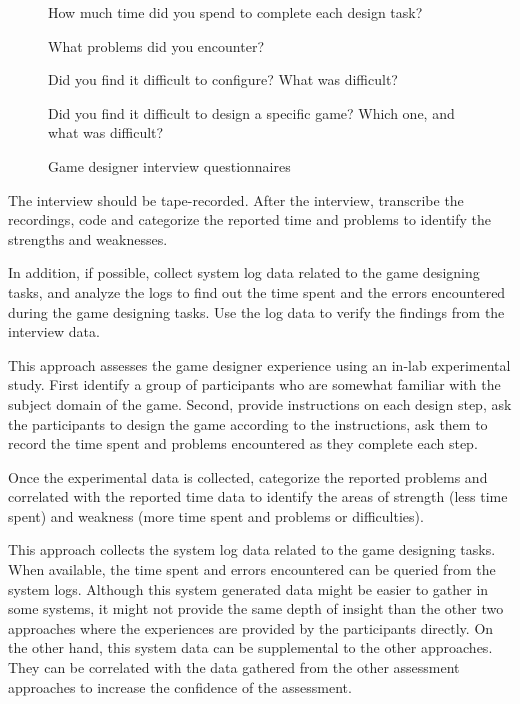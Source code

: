 \begin{figure}[ht!]
\begin{mybox}
\begin{compactenum}
\item How much time did you spend to complete each design task?
\item What problems did you encounter?
\item Did you find it difficult to configure? What was difficult?
\item Did you find it difficult to design a specific game? Which one, and what was difficult?
\end{compactenum}
\end{mybox}
\caption{Game designer interview questionnaires}
\label{fig:game-designer-interview}  
\end{figure}

The interview should be tape-recorded. After the interview, transcribe the recordings, code and categorize the reported 
time and problems to identify the strengths and weaknesses.

In addition, if possible, collect system log data related to the game designing tasks, and analyze the logs to find out the time 
spent and the errors encountered during the game designing tasks. Use the log data to verify the findings from the interview data.

\label{In-lab game design study}

This approach assesses the game designer experience using an in-lab experimental study.  First identify a group 
of participants who are somewhat familiar with the subject domain of the game. Second, provide instructions on 
each design step, ask the participants to design the game according to the instructions, ask them to record 
the time spent and problems encountered as they complete each step.

Once the experimental data is collected, categorize the reported problems and correlated with the reported time data 
to identify the areas of strength (less time spent) and weakness (more time spent and problems or difficulties). 

\label{Game design log data analysis}

This approach collects the system log data related to the game designing tasks. When
available, the time spent and errors encountered can be queried from the system logs. Although this
system generated data might be easier to gather in some systems, it might not provide the same
depth of insight than the other two approaches where the experiences are provided by the
participants directly. On the other hand, this system data can be supplemental to the other
approaches. They can be correlated with the data gathered from the other assessment approaches
 to increase the confidence of the assessment.

